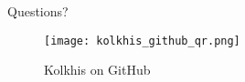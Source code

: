 \documentclass[14pt,compress,dvipsnames,aspectratio=169]{beamer} %
\begin{document}
\begin{frame}{Questions?}
    \begin{figure}
        \centering
        \texttt{[image: kolkhis\_github\_qr.png]}
        \caption{Kolkhis on GitHub}
        \label{}
    \end{figure}
\end{frame}
\end{document}

